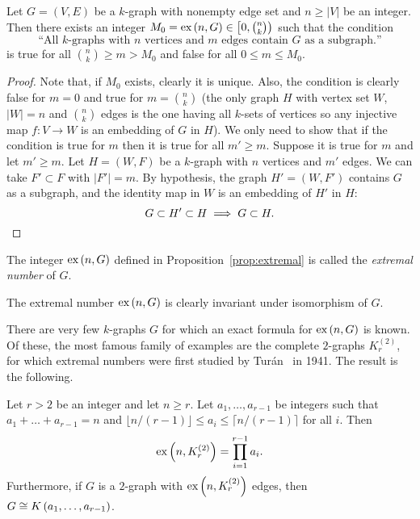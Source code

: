 \begin{proposition} \label{prop:extremal}
    Let $G = (V, E)$ be a $k$-graph with nonempty edge set and $n \geq |V|$ be an integer.
    Then there exists an integer $M_0 = \text{ex} \left( n, G \right) \in \left[ 0, \binom{n}{k}\right)$ such that
    the condition
    \[
        \text{``All $k$-graphs with $n$ vertices and $m$ edges contain $G$ as a subgraph.''}
    \]
    is true for all $\binom{n}{k} \geq m > M_0$ and false for all $0 \leq m \leq M_0$.

    \begin{proof}
        Note that, if $M_0$ exists, clearly it is unique.
        Also, the condition is clearly false for $m = 0$ and
        true for $m = \binom{n}{k}$
        (the only graph $H$ with vertex set $W$, $|W|=n$ and $\binom{n}{k}$ edges
        is the one having all $k$-sets of vertices so any injective map $f: V \to W$
        is an embedding of $G$ in $H$).
        We only need to show that if the condition is true for $m$ then it is true for
        all $m' \geq m$.
        Suppose it is true for $m$ and let $m' \geq m$.
        Let $H = (W, F)$ be a $k$-graph with $n$ vertices and $m'$ edges.
        We can take $F' \subset F$ with $|F'| = m$.
        By hypothesis, the graph $H' = (W, F')$ contains $G$ as a subgraph,
        and the identity map in $W$ is an embedding of $H'$ in $H$:
        \[
            G \subset H' \subset H \implies G \subset H. \qedhere
        \]
    \end{proof}

\end{proposition}

\begin{definition}
    The integer $\text{ex} \left( n, G \right)$ defined in Proposition~\ref{prop:extremal}
    is called the \emph{extremal number} of $G$.
\end{definition}

\begin{remark}
    The extremal number $\text{ex} \left( n, G \right)$ is clearly invariant under isomorphism of $G$.
\end{remark}

There are very few $k$-graphs $G$ for which an exact formula for $\text{ex} \left( n, G \right)$ is known.
Of these, the most famous family of examples are the complete $2$-graphs $K_r^{(2)}$,
for which extremal numbers were first studied by Turán~\cite{Turan1941} in 1941.
The result is the following.

\begin{theorem}
    \label{thm:turan}
    Let $r > 2$ be an integer and let $n \geq r$.
    Let $a_1, \dots, a_{r-1}$ be integers such that $a_1 + \dots + a_{r-1} = n$
    and $\lfloor n / (r-1) \rfloor \leq a_i \leq \lceil n / (r-1) \rceil$ for all $i$.
    Then
    \[
        \text{ex} \left( n, K_r^{(2)} \right) = \prod_{i=1}^{r-1} a_i.
    \]
    Furthermore, if $G$ is a $2$-graph with $\text{ex} \left( n, K_r^{(2)} \right)$ edges,
    then $G\cong K\left(a_1, \dots, a_{r-1}\right)$.
\end{theorem}

